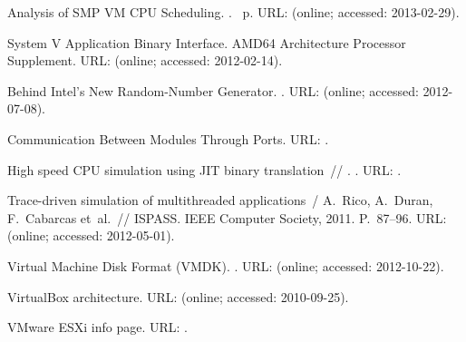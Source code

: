 \begin{thebibliography}{10}
 Analysis of {SMP} {VM} {CPU} Scheduling. \BibDash
{}. \BibDash
{}~p. \BibDash
\newblock URL:
   (online;
  accessed: 2013-02-29).

System {V} Application Binary Interface. {AMD64} Architecture Processor
  Supplement. \BibDash
\newblock URL:  (online;
  accessed: 2012-02-14).

 Behind {Intel}'s New Random-Number Generator.
  \BibDash
{}. \BibDash
\newblock URL:
  (online; accessed: 2012-07-08).

 {Communication Between Modules Through Ports}. \BibDash
\newblock URL:
  .

 {High speed {CPU} simulation using {JIT} binary
  translation}~// . \BibDash
{}. \BibDash
\newblock URL: .

{Trace-driven simulation of multithreaded applications}~/ A.~Rico, A.~Duran,
  F.~Cabarcas et~al.~// {ISPASS}. \BibDash
\newblock IEEE Computer Society, 2011. \BibDash
\newblock P.~87–96. \BibDash
\newblock URL:  (online;
  accessed: 2012-05-01).

Virtual Machine Disk Format {(VMDK)}. \BibDash
{}. \BibDash
\newblock URL:
  (online; accessed: 2012-10-22).

{{VirtualBox} architecture}. \BibDash
\newblock URL: 
  (online; accessed: 2010-09-25).

{{VMware} {ESXi} info page}. \BibDash
\newblock URL:
  .


\end{thebibliography}
